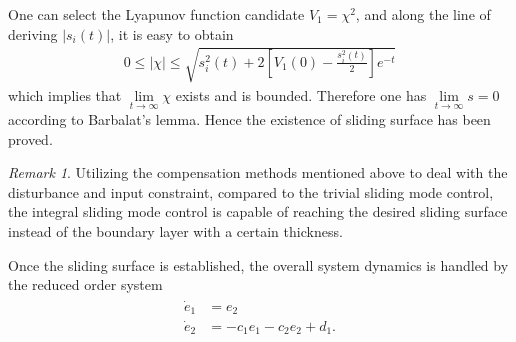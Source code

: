 \documentclass[ShortAfour]{sage}
\theoremstyle{plain}
\theoremstyle{remark}
\newtheorem{myrem}{Remark}
\begin{document}
One can select the Lyapunov function candidate $V_1=\chi^2$, and along the line of deriving $\vert s_i(t)\vert$, it is easy to obtain
\begin{align}
  0\le\vert \chi\vert\le\sqrt{s_i^2(t)+2\left[V_1(0)-\frac{s_i^2(t)}{2}\right]e^{-t}}\label{eq:chi}
\end{align}
which implies that $\lim\limits_{t\to \infty}\chi$ exists and is bounded. Therefore one has $\lim\limits_{t\to \infty}s=0$ according to Barbalat's lemma. Hence the existence of sliding surface has been proved.
\begin{myrem}
  Utilizing the compensation methods mentioned above to deal with the disturbance and input constraint, compared to the trivial sliding mode control, the integral sliding mode control is capable of reaching the desired sliding surface instead of the boundary layer with a certain thickness.
\end{myrem}
Once the sliding surface is established, the overall system dynamics is handled by the reduced order system
\begin{align}\begin{split}
  \dot e_1 &= e_2\\
  \dot e_2 &= -c_1e_1-c_2e_2+d_1.\label{eq:reduced model}
\end{split}\end{align}
\end{document}
